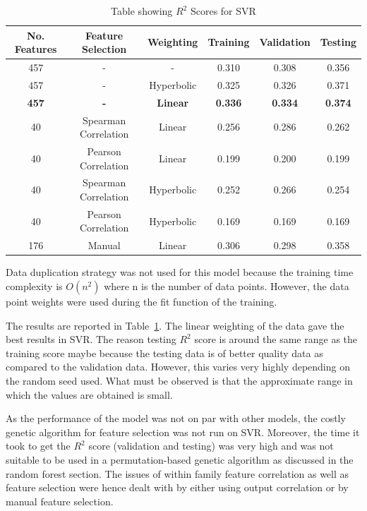 \documentclass[11pt]{article}
\begin{document}
\begin{table} [h!]
\centering
\resizebox{\linewidth}{!} {
 \begin{tabular}{ | c | c | c | c | c | c | }
\hline
\textbf{No. Features} & \textbf{Feature Selection} & \textbf{Weighting} & \textbf{Training} & \textbf{Validation} &  \textbf{Testing} \\ [0.5 ex]
\hline \hline
457 & - & - & 0.310 & 0.308 & 0.356\\
457 & - & Hyperbolic & 0.325 & 0.326 & 0.371\\
\textbf{457} & \textbf{-} & \textbf{Linear}  & \textbf{0.336} &\textbf{0.334} & \textbf{0.374}\\
40 & Spearman Correlation & Linear & 0.256 & 0.286  & 0.262 \\ 
40 & Pearson Correlation & Linear & 0.199 & 0.200 & 0.199 \\ 
40 & Spearman Correlation & Hyperbolic & 0.252 & 0.266 & 0.254 \\ 
40 & Pearson Correlation & Hyperbolic & 0.169 & 0.169 & 0.169 \\ 
176 & Manual & Linear &  0.306  & 0.298  & 0.358\\ [1ex]
\hline
\end{tabular}
}
\caption{Table showing  $R^2$ Scores for SVR}
\label {table:2}
\end{table}

Data duplication strategy was not used for this model because the training time complexity is $O(n^2)$ where n is the number of data points.
However, the data point weights were used during the fit function of the training.

The results are reported in Table~\ref{table:2}.
The linear weighting of the data gave the best results in SVR.
The reason testing $R^2$ score is around the same range as the training score maybe because the testing data is of better quality data as compared to the validation data.
However, this varies very highly depending on the random seed used.
What must be observed is that the approximate range in which the values are obtained is small.

As the performance of the model was not on par with other models,
the costly genetic algorithm for feature selection was not run on SVR.
Moreover,  the time it took to get the $R^2$ score (validation and testing) was very high and was not suitable to be used in a permutation-based genetic algorithm as discussed in the random forest section.
The issues of within family feature correlation as well as feature selection were hence dealt with by either using output correlation or by manual feature selection.
\end{document}

